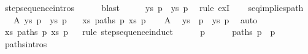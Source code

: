 \begin{isabellebody}
\ step{\isacharunderscore}{\kern0pt}sequence{\isachardot}{\kern0pt}intros{\isacharparenleft}{\kern0pt}{}{\isacharparenright}{\kern0pt}\isanewline
\ \ \ \ \isamarkupfalse%
\ blast\isanewline
\ \ \isamarkupfalse%
\ \isamarkupfalse%
\ {\isachardoublequoteopen}{\isasymexists}ys{\isachardot}{\kern0pt}\ p\ {\isasymmapsto}{\isachardollar}{\kern0pt}\ ys\ p{\isacharprime}{\kern0pt}{\isacharprime}{\kern0pt}{\isachardoublequoteclose}\ \isamarkupfalse%
\ {\isacharparenleft}{\kern0pt}rule\ exI{\isacharparenright}{\kern0pt}\isanewline
\ \ \isamarkupfalse%
\isanewline
{}\isamarkupfalse%
%
\endisatagproof
{\isafoldproof}%
%
\isadelimproof
\isanewline
%
\endisadelimproof
\isanewline
{}\isamarkupfalse%
\ seq{\isacharunderscore}{\kern0pt}implies{\isacharunderscore}{\kern0pt}path{\isacharcolon}{\kern0pt}\isanewline
\ \ \ A{}{\isacharcolon}{\kern0pt}\ {\isachardoublequoteopen}{\isasymexists}ys{\isachardot}{\kern0pt}\ p\ {\isasymmapsto}{\isachardollar}{\kern0pt}\ ys\ p{\isacharprime}{\kern0pt}{\isachardoublequoteclose}\isanewline
\ \ \ {\isachardoublequoteopen}{\isasymexists}xs{\isachardot}{\kern0pt}\ paths\ p\ xs\ p{\isacharprime}{\kern0pt}{\isachardoublequoteclose}\isanewline
%
\isadelimproof
%
\endisadelimproof
%
\isatagproof
{}\isamarkupfalse%
{\isacharminus}{\kern0pt}\isanewline
\ \ \isamarkupfalse%
\ A{}\ \isamarkupfalse%
\ ys\ \ {\isachardoublequoteopen}p\ {\isasymmapsto}{\isachardollar}{\kern0pt}\ ys\ p{\isacharprime}{\kern0pt}{\isachardoublequoteclose}\ \isamarkupfalse%
\ auto\isanewline
\ \ \isamarkupfalse%
\ \isamarkupfalse%
\ {\isachardoublequoteopen}{\isasymexists}xs{\isachardot}{\kern0pt}\ paths\ p\ xs\ p{\isacharprime}{\kern0pt}{\isachardoublequoteclose}\isanewline
\ \ \isamarkupfalse%
{\isacharparenleft}{\kern0pt}rule\ step{\isacharunderscore}{\kern0pt}sequence{\isachardot}{\kern0pt}induct{\isacharparenright}{\kern0pt}\isanewline
\ \ \ \ \isamarkupfalse%
\ p\isanewline
\ \ \ \ \isamarkupfalse%
\ {\isachardoublequoteopen}paths\ p\ {\isacharbrackleft}{\kern0pt}{\isacharbrackright}{\kern0pt}\ p{\isachardoublequoteclose}\ \isamarkupfalse%
\ paths{\isachardot}{\kern0pt}intros{\isacharparenleft}{\kern0pt}{}{\isacharparenright}{\kern0pt}\isacommand{{\isachardot}{\kern0pt}}\isamarkupfalse%
\isanewline

\end{isabellebody}
